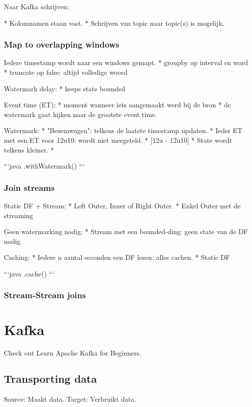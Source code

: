 \documentclass[a4paper,10pt,twoside]{report}
\begin{document}
Naar Kafka schrijven:

* Kolomnamen staan vast. 
* Schrijven van topic naar topic(s) is mogelijk.

\subsection{Map to overlapping windows}

Iedere timestamp wordt naar een windows gemapt.
* groupby op interval en word
* truncate op false: altijd volledige woord


Watermark delay:
* keeps state bounded


Event time (ET): 
* moment wanneer iets aangemaakt werd bij de bron
* de watermark gaat kijken naar de grootste event time.

Watermark:
* "Bezemwagen": telkens de laatste timestamp updaten.
* Ieder ET met een ET voor 12u10: wordt niet meegeteld.
* [12u - 12u10]
* State wordt telkens kleiner.
* 

```java
.withWatermark()
```

\subsection{Join streams}

Static DF + Stream:
* Left Outer, Inner of Right Outer.
* Enkel Outer met de streaming

Geen watermarking nodig:
* Stream met een bounded-ding: geen state van de DF nodig.

Caching:
* Iedere n aantal seconden een DF lezen: alles cachen.
* Static DF

```java
.cache()
```

\subsection{Stream-Stream joins}


\chapter{Kafka}

Check out Learn Apache Kafka for Beginners.

\section{Transporting data}

Source: Maakt data.
Target: Verbruikt data.
\end{document}
